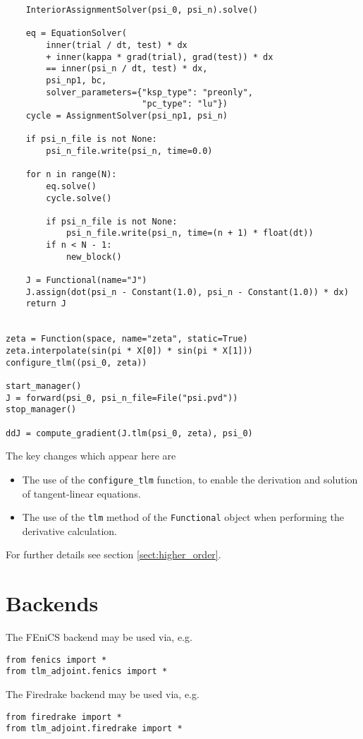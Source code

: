 \documentclass[11pt]{article}
\begin{document}
\begin{lstlisting}
    InteriorAssignmentSolver(psi_0, psi_n).solve()

    eq = EquationSolver(
        inner(trial / dt, test) * dx
        + inner(kappa * grad(trial), grad(test)) * dx
        == inner(psi_n / dt, test) * dx,
        psi_np1, bc,
        solver_parameters={"ksp_type": "preonly",
                           "pc_type": "lu"})
    cycle = AssignmentSolver(psi_np1, psi_n)

    if psi_n_file is not None:
        psi_n_file.write(psi_n, time=0.0)

    for n in range(N):
        eq.solve()
        cycle.solve()

        if psi_n_file is not None:
            psi_n_file.write(psi_n, time=(n + 1) * float(dt))
        if n < N - 1:
            new_block()

    J = Functional(name="J")
    J.assign(dot(psi_n - Constant(1.0), psi_n - Constant(1.0)) * dx)
    return J


zeta = Function(space, name="zeta", static=True)
zeta.interpolate(sin(pi * X[0]) * sin(pi * X[1]))
configure_tlm((psi_0, zeta))

start_manager()
J = forward(psi_0, psi_n_file=File("psi.pvd"))
stop_manager()

ddJ = compute_gradient(J.tlm(psi_0, zeta), psi_0)
\end{lstlisting}

The key changes which appear here are
\begin{itemize}
  \item The use of the \texttt{configure\_tlm} function, to enable the
    derivation and solution of tangent-linear equations. 
  \item The use of the \texttt{tlm} method of the \texttt{Functional} object
    when performing the derivative calculation.
\end{itemize}
For further details see section \ref{sect:higher_order}.

\section{Backends}\label{sect:backends}

The FEniCS backend may be used via, e.g.
\begin{lstlisting}
from fenics import *
from tlm_adjoint.fenics import *
\end{lstlisting}

The Firedrake backend may be used via, e.g.
\begin{lstlisting}
from firedrake import *
from tlm_adjoint.firedrake import *
\end{lstlisting}
\end{document}
